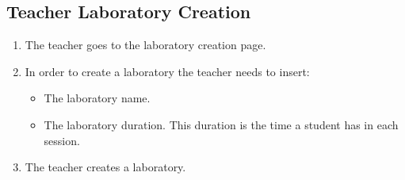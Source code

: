 \subsection{Teacher Laboratory Creation}

\begin{enumerate}
    \item The teacher goes to the laboratory creation page.
    \item In order to create a laboratory the teacher needs to insert:
    \begin{itemize}
        \item The laboratory name.
        \item The laboratory duration. This duration is the time a student has in each session.
    \end{itemize}
    \item The teacher creates a laboratory.
\end{enumerate}
